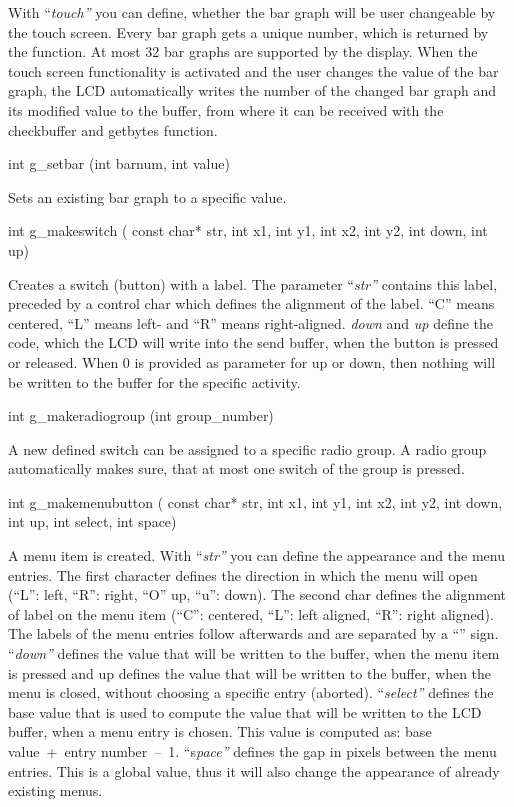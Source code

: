 \documentclass[
]{article}
\begin{document}
With ``\emph{touch''} you can define, whether the bar graph will be user
changeable by the touch screen. Every bar graph gets a unique number,
which is returned by the function. At most 32 bar graphs are supported
by the display. When the touch screen functionality is activated and the
user changes the value of the bar graph, the LCD automatically writes
the number of the changed bar graph and its modified value to the
buffer, from where it can be received with the checkbuffer and getbytes
function.

int g\_setbar (int barnum, int value)

Sets an existing bar graph to a specific value.

int g\_makeswitch ( const char* str, int x1, int y1, int x2, int y2, int
down, int up)

Creates a switch (button) with a label. The parameter ``\emph{str''}
contains this label, preceded by a control char which defines the
alignment of the label. ``C'' means centered, ``L'' means left- and
``R'' means right-aligned. \emph{down} and \emph{up} define the code,
which the LCD will write into the send buffer, when the button is
pressed or released. When 0 is provided as parameter for up or down,
then nothing will be written to the buffer for the specific activity.

int g\_makeradiogroup (int group\_number)

A new defined switch can be assigned to a specific radio group. A radio
group automatically makes sure, that at most one switch of the group is
pressed.

int g\_makemenubutton ( const char* str, int x1, int y1, int x2, int y2,
int down, int up, int select, int space)

A menu item is created. With ``\emph{str''} you can define the
appearance and the menu entries. The first character defines the
direction in which the menu will open (``L'': left, ``R'': right, ``O''
up, ``u'': down). The second char defines the alignment of label on the
menu item (``C'': centered, ``L'': left aligned, ``R'': right aligned).
The labels of the menu entries follow afterwards and are separated by a
``\textbar'' sign. ``\emph{down''} defines the value that will be
written to the buffer, when the menu item is pressed and up defines the
value that will be written to the buffer, when the menu is closed,
without choosing a specific entry (aborted). ``\emph{select''} defines
the base value that is used to compute the value that will be written to
the LCD buffer, when a menu entry is chosen. This value is computed as:
base value~+~entry number~--~1. ``s\emph{pace''} defines the gap in
pixels between the menu entries. This is a global value, thus it will
also change the appearance of already existing menus.
\end{document}
